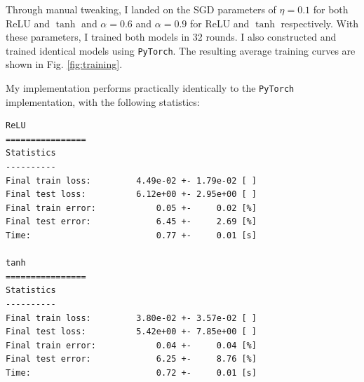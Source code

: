 \documentclass[prl, article, twocolumn]{revtex4-1}
\begin{document}
Through manual tweaking, I landed on the SGD parameters of $\eta=0.1$ for both ReLU and $\tanh$ and $\alpha=0.6$ and $\alpha=0.9$ for ReLU and $\tanh$ respectively. With these parameters, I trained both models in 32 rounds. I also constructed and trained identical models using \texttt{PyTorch}. The resulting average training curves are shown in Fig. \ref{fig:training}.

My implementation performs practically identically to the \texttt{PyTorch} implementation, with the following statistics:

\begin{verbatim}
ReLU
================
Statistics
----------
Final train loss:         4.49e-02 +- 1.79e-02 [ ]
Final test loss:          6.12e+00 +- 2.95e+00 [ ]
Final train error:            0.05 +-     0.02 [%]
Final test error:             6.45 +-     2.69 [%]
Time:                         0.77 +-     0.01 [s]

tanh
================
Statistics
----------
Final train loss:         3.80e-02 +- 3.57e-02 [ ]
Final test loss:          5.42e+00 +- 7.85e+00 [ ]
Final train error:            0.04 +-     0.04 [%]
Final test error:             6.25 +-     8.76 [%]
Time:                         0.72 +-     0.01 [s]
\end{verbatim}
\end{document}
